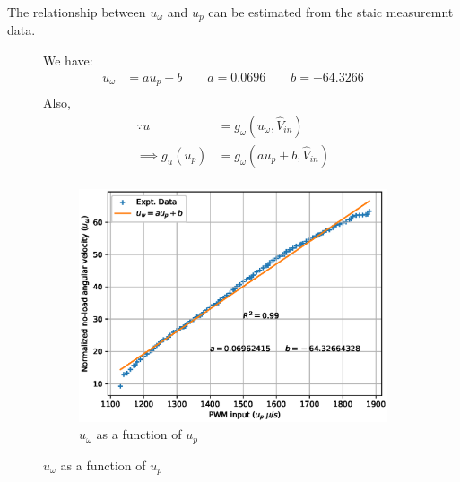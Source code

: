 The relationship between $u_\omega$ and $u_p$ can be estimated from the staic measuremnt data.
\begin{figure}[H]
    \begin{minipage}{0.49\textwidth}
    We have:
        \begin{align*}
            u_\omega &= a u_p + b
            \qquad a = 0.0696
            \qquad b = -64.3266\\
        \end{align*}
    Also,
        \begin{align*}
            \because u &= g_\omega(u_\omega, \hat V_{in})\\
            \implies g_u(u_p) &= g_\omega(a u_p  + b, \hat V_{in})\\
        \end{align*}
    \end{minipage}
    \begin{minipage}{0.49\textwidth}
       \begin{figure}[H]
            \centering
            \includegraphics[width = \textwidth]{./figs/norm_omega/no-load_rpm.eps}
            \caption{$u_\omega$ as a function of $u_p$}
        \end{figure}
    \end{minipage}
\end{figure}
